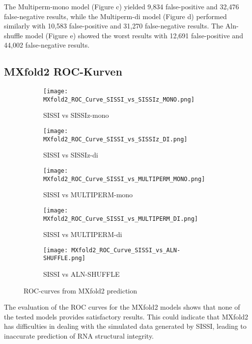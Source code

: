 \documentclass{article}
\begin{document}
\begin{large}
\begin{large}
\begin{large}
The Multiperm-mono model (Figure c) yielded 9,834 false-positive and 32,476 false-negative results, while the Multiperm-di model (Figure d) performed similarly with 10,583 false-positive and 31,270 false-negative results. The Aln-shuffle model (Figure e) showed the worst results with 12,691 false-positive and 44,002 false-negative results.\vspace{1em}

\subsection{MXfold2 ROC-Kurven}

\begin{figure}[H]
    \centering
    \begin{subfigure}[b]{0.48\textwidth}
        \texttt{[image: MXfold2\_ROC\_Curve\_SISSI\_vs\_SISSIz\_MONO.png]}
        \caption{SISSI vs SISSIz-mono}
    \end{subfigure}
    \hfill
    \begin{subfigure}[b]{0.48\textwidth}
        \texttt{[image: MXfold2\_ROC\_Curve\_SISSI\_vs\_SISSIz\_DI.png]}
        \caption{SISSI vs SISSIz-di}
    \end{subfigure}
    \vspace{1em}

    \begin{subfigure}[b]{0.48\textwidth}
        \texttt{[image: MXfold2\_ROC\_Curve\_SISSI\_vs\_MULTIPERM\_MONO.png]}
        \caption{SISSI vs MULTIPERM-mono}
    \end{subfigure}
    \hfill
    \begin{subfigure}[b]{0.48\textwidth}
        \texttt{[image: MXfold2\_ROC\_Curve\_SISSI\_vs\_MULTIPERM\_DI.png]}
        \caption{SISSI vs MULTIPERM-di}
    \end{subfigure}
    \vspace{1em}

    \begin{subfigure}[b]{0.48\textwidth}
        \texttt{[image: MXfold2\_ROC\_Curve\_SISSI\_vs\_ALN-SHUFFLE.png]}
        \caption{SISSI vs ALN-SHUFFLE}
    \end{subfigure}

    \caption{ROC-curves from MXfold2 prediction}
\end{figure}

The evaluation of the ROC curves for the MXfold2 models shows that none of the tested models provides satisfactory results. This could indicate that MXfold2 has difficulties in dealing with the simulated data generated by SISSI, leading to inaccurate prediction of RNA structural integrity.\vspace{1em}


\end{large}
\end{large}
\end{large}
\end{document}
